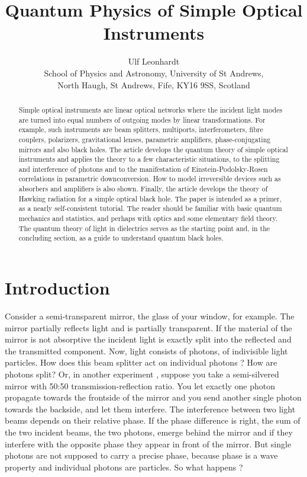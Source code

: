 \documentclass[12pt,amsmath,amssymb]{article}
\numberwithin{equation}{section}
\begin{document}
\title{\sc Quantum Physics of Simple Optical Instruments}
\author{Ulf Leonhardt\\
School of Physics and Astronomy, University of St Andrews,\\
North Haugh, St Andrews, Fife, KY16 9SS, Scotland}
\maketitle
\begin{abstract}
Simple optical instruments are linear optical networks
where the incident light modes are turned into equal
numbers of outgoing modes by linear transformations.
For example, such instruments are beam splitters, multiports,
interferometers, fibre couplers, polarizers, gravitational lenses,
parametric amplifiers, phase-conjugating mirrors
and also black holes.
The article develops the quantum theory of
simple optical instruments and applies the theory to
a few characteristic situations, to the
splitting and interference of photons and to the
manifestation of Einstein-Podolsky-Rosen correlations
in parametric downconversion.
How to model irreversible devices
such as absorbers and amplifiers is also shown.
Finally, the article develops the theory of Hawking radiation
for a simple optical black hole.
The paper is intended as a primer,
as a nearly self-consistent tutorial.
The reader should be familiar with
basic quantum mechanics and statistics, and perhaps with optics
and some elementary field theory.
The quantum theory of light in dielectrics serves as
the starting point and, in the concluding section,
as a guide to understand quantum black holes.

\end{abstract}
\newpage

\section{Introduction}

Consider a semi-transparent mirror, the glass of your window, for example.
The mirror partially reflects light and is partially transparent.
If the material of the mirror is not absorptive the incident light is
exactly split into the reflected and the transmitted component.
Now, light consists of photons, of indivisible light particles.
How does this beam splitter act on individual photons \cite{Brendel,Paul}?
How are photons split?
Or, in another experiment \cite{Hong},
suppose you take a semi-silvered mirror with 50:50
transmission-reflection ratio.
You let exactly one photon propagate towards the frontside of the mirror
and you send another single photon towards the backside,
and let them interfere.
The interference between two light beams depends on their relative phase.
If the phase difference is right, the sum of the two incident beams,
the two photons, emerge behind the mirror
and if they interfere with the opposite phase they appear in front of the mirror.
But single photons are not supposed to carry a precise phase,
because phase is a wave property and individual photons are particles.
So what happens \cite{Hong,Paul}?
\end{document}
